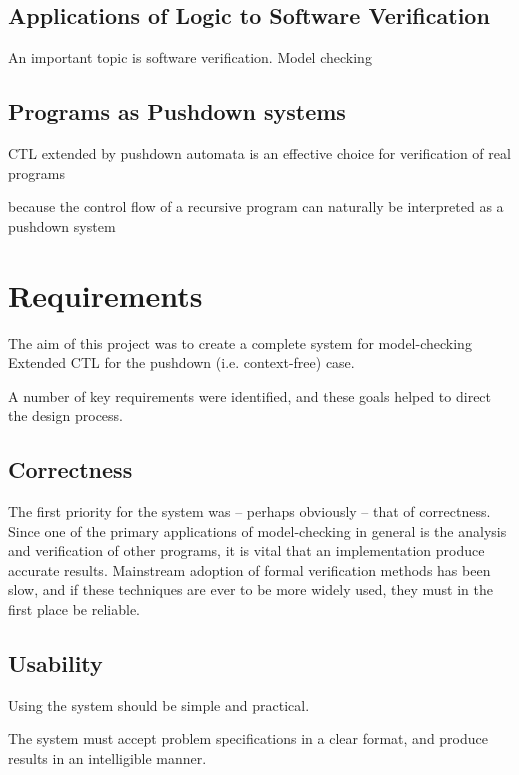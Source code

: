 \documentclass[11pt]{article}
\theoremstyle{definition}
\begin{document}
\subsection{Applications of Logic to Software Verification}

An important topic 
is software verification.
Model checking



\subsection{Programs as Pushdown systems}

CTL extended by pushdown automata is an effective choice for verification of real programs

because the control flow of a recursive program can naturally be 
interpreted
as a pushdown system

\section{Requirements}

The aim of this project was to create a complete system for model-checking
Extended CTL for the pushdown (i.e. context-free) case. 

A number of key requirements were identified, and these goals helped to direct
the design process. 


\subsection{Correctness}
The first priority for the system was -- perhaps obviously -- that of
correctness. Since one of the primary applications of model-checking in general
is the analysis and verification of other programs, it is vital that an
implementation produce accurate results. Mainstream adoption of formal
verification methods has been slow\cite{mitra2008strategies}, and if these
techniques are ever to be more widely used, they must in the first place be
reliable.


\subsection{Usability}

Using the system should be simple and practical.

The system must accept problem specifications in a clear format, 
and produce results in an intelligible manner.
\end{document}
